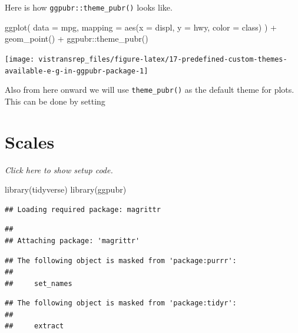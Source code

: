 \documentclass[]{book}
\newenvironment{Shaded}{}{}
\newcommand{\DataTypeTok}[1]{#1}
\newcommand{\KeywordTok}[1]{\textcolor[rgb]{0.00,0.00,1.00}{#1}}
\newcommand{\NormalTok}[1]{#1}
\newcommand{\OperatorTok}[1]{#1}
\newcommand{\StringTok}[1]{\textcolor[rgb]{0.00,0.50,0.50}{#1}}
\begin{document}
Here is how \texttt{ggpubr::theme\_pubr()} looks like.

\begin{Shaded}
\begin{Highlighting}[]
\KeywordTok{ggplot}\NormalTok{(}
  \DataTypeTok{data =}\NormalTok{ mpg,}
  \DataTypeTok{mapping =} \KeywordTok{aes}\NormalTok{(}\DataTypeTok{x =}\NormalTok{ displ, }\DataTypeTok{y =}\NormalTok{ hwy, }\DataTypeTok{color =}\NormalTok{ class)}
\NormalTok{) }\OperatorTok{+}
\StringTok{  }\KeywordTok{geom_point}\NormalTok{() }\OperatorTok{+}
\StringTok{  }\NormalTok{ggpubr}\OperatorTok{::}\KeywordTok{theme_pubr}\NormalTok{()}
\end{Highlighting}
\end{Shaded}

\begin{flushright}\texttt{[image: vistransrep\_files/figure-latex/17-predefined-custom-themes-available-e-g-in-ggpubr-package-1]} \end{flushright}

Also from here onward we will use \texttt{theme\_pubr()} as the default theme for plots.
This can be done by setting

\hypertarget{scales}{%
\section{Scales}\label{scales}}

\emph{Click here to show setup code.}

\begin{Shaded}
\begin{Highlighting}[]
\KeywordTok{library}\NormalTok{(tidyverse)}
\KeywordTok{library}\NormalTok{(ggpubr)}
\end{Highlighting}
\end{Shaded}

\begin{verbatim}
## Loading required package: magrittr
\end{verbatim}

\begin{verbatim}
## 
## Attaching package: 'magrittr'
\end{verbatim}

\begin{verbatim}
## The following object is masked from 'package:purrr':
## 
##     set_names
\end{verbatim}

\begin{verbatim}
## The following object is masked from 'package:tidyr':
## 
##     extract
\end{verbatim}
\end{document}
